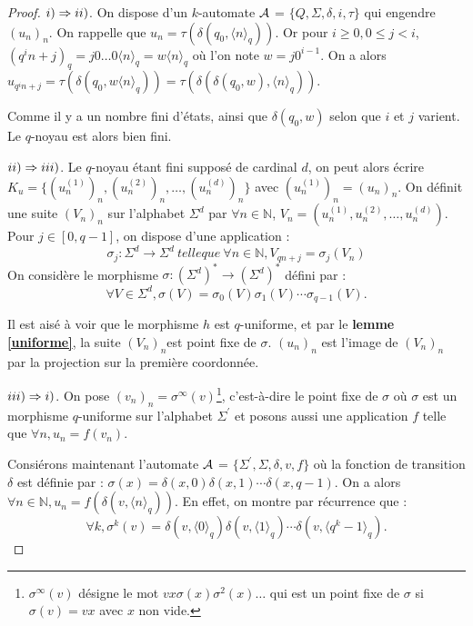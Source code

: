 \documentclass[12pt]{article}
\theoremstyle{plain}
\theoremstyle{definition}
\theoremstyle{remark}
\begin{document}
\begin{proof}
  $\romannumeral1)\Rightarrow\romannumeral2)$. On dispose d'un $k$-automate $\cal{A}$ = $\{Q,\Sigma,\delta,i,\tau\}$  
  qui engendre $(u_{n})_{n}$. On rappelle que $u_{n}=\tau(\delta(q_{0},\langle{n}\rangle_{q}))$. Or pour $i\ge
  {0},0\le{j}<i$, $(q^{i}n+j)_{q}=j0\ldots0\langle{n}\rangle_{q}=w\langle{n}\rangle_{q}$ o\`u l'on note 
  $w=j0^{i-1}$. On a alors $u_{q^{i}n+j}=\tau(\delta(q_{0},w\langle{n}\rangle_{q}))=\tau(\delta(\delta(q_{0},w),
  \langle{n}\rangle_{q})).$
 
  Comme il y a un nombre fini d'\'etats, ainsi que $\delta(q_{0},w)$ selon que $i$ et
  $j$ varient. Le $q$-noyau est alors bien fini.

  $\romannumeral2)\Rightarrow\romannumeral3)$. Le $q$-noyau \'etant fini suppos\'e de cardinal $d$, on peut alors
  \'ecrire $K_{u}=\{(u_{n}^{(1)})_{n},(u_{n}^{(2)})_{n},\ldots,(u_{n}^{(d)})_{n}\}$ avec $(u_{n}^{(1)})_{n}=(u_{n})
  _{n}$. On d\'efinit une suite $(V_{n})_{n}$ sur l'alphabet $\Sigma^{d}$ par $\forall{n}\in\mathbb{N}$, $V_{n}=
  (u_{n}^{(1)},u_{n}^{(2)},\ldots,u_{n}^{(d)})$. Pour $j\in[0,q-1]$, on dispose d'une application :
  $$\sigma_{j}:\Sigma^{d}\rightarrow\Sigma^{d}\ telle que\ \forall{n}\in\mathbb{N},V_{qn+j}=\sigma_{j}(V_{n})$$
  On consid\`ere le morphisme $\sigma:(\Sigma^{d})^{*}\rightarrow(\Sigma^{d})^{*}$ d\'efini par :
  $$\forall{V}\in\Sigma^{d},\sigma(V)=\sigma_{0}(V)\sigma_{1}(V)\cdots \sigma_{q-1}(V).$$
  
  Il est ais\'e \`a voir que le morphisme $h$ est $q$-uniforme, et par le \textbf{lemme \ref{uniforme}}, la suite
  $(V_{n})_{n} $est point fixe de $\sigma$. $(u_{n})_{n}$ est l'image de $(V_{n})_{n}$ par la projection sur la
  premi\`ere coordonn\'ee. 

  $\romannumeral3)\Rightarrow\romannumeral1)$. On pose $(v_{n})_{n}=\sigma^{\infty}(v)$\footnote{$\sigma^{\infty}
  (v)$ d\'esigne le mot $vx\sigma(x)\sigma^{2}(x)\ldots$ qui est un point fixe de $\sigma$ si $\sigma(v)=vx$ avec
  $x$ non vide.}, c'est-\`a-dire le point fixe de $\sigma$ o\`u $\sigma$ est un morphisme $q$-uniforme sur
  l'alphabet $\Sigma^{'}$ et posons aussi une application $f$ telle que $\forall{n},u_{n}=f(v_{n})$.

  Consi\'erons maintenant l'automate $\cal{A}$ = $\{\Sigma^{'},\Sigma,\delta,v,f\}$ o\`u la fonction de transition
  $\delta$ est d\'efinie par : $\sigma(x)=\delta(x,0)\delta(x,1)\cdots\delta(x,q-1)$. On a alors $\forall{n}\in
  \mathbb{N},u_{n}=f(\delta(v,\langle{n}\rangle_{q}))$. En effet, on montre par r\'ecurrence que :
  $$\forall{k},\sigma^{k}(v)=\delta(v,\langle{0}\rangle_{q})\delta(v,\langle{1}\rangle_{q})\cdots\delta(v,
  \langle{q^{k}-1}\rangle_{q}).$$
  

\end{proof}
\end{document}
